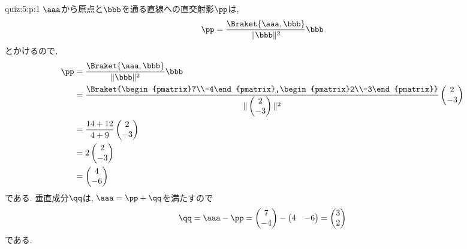 \begin{answerof}{quiz:5:p:1}
$\aaa$から原点と$\bbb$を通る直線への直交射影$\pp$は,
\begin{align*}
\pp=\frac{\Braket{\aaa,\bbb}}{\|\bbb\|^2}\bbb
\end{align*}
とかけるので,
\begin{align*}
  \pp&=\frac{\Braket{\aaa,\bbb}}{\|\bbb\|^2}\bbb\\
  &=\frac{\Braket{\begin{pmatrix}7\\-4\end{pmatrix},\begin{pmatrix}2\\-3\end{pmatrix}}}{\|\begin{pmatrix}2\\-3\end{pmatrix}\|^2}\begin{pmatrix}2\\-3\end{pmatrix}\\
  &=\frac{14+12}{4+9}\begin{pmatrix}2\\-3\end{pmatrix}\\
  &=2\begin{pmatrix}2\\-3\end{pmatrix}\\
  &=\begin{pmatrix}4\\-6\end{pmatrix}
\end{align*}
である.
垂直成分$\qq$は,
$\aaa=\pp+\qq$を満たすので
\begin{align*}
  \qq=\aaa-\pp
  =\begin{pmatrix}7\\-4\end{pmatrix}-\begin{pmatrix}4&-6\end{pmatrix}
  =\begin{pmatrix}3\\2\end{pmatrix}
\end{align*}
である.
\end{answerof}

